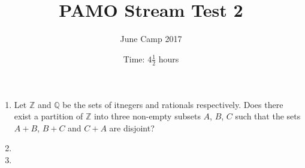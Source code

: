 \documentclass{article}
\title{PAMO Stream Test 2}
\author{June Camp 2017}
\date{Time: $4\frac{1}{2}$ hours}
\begin{document}
 \maketitle

\begin{enumerate}

\item %
	Let $\mathbb{Z}$ and $\mathbb{Q}$ be the sets of itnegers and rationals respectively. Does there exist a partition of $\mathbb{Z}$ into three non-empty subsets $A$, $B$, $C$ such that the sets $A+B$, $B+C$ and $C+A$ are disjoint?

\item %
	

\item %
	

\end{enumerate}
\end{document}
